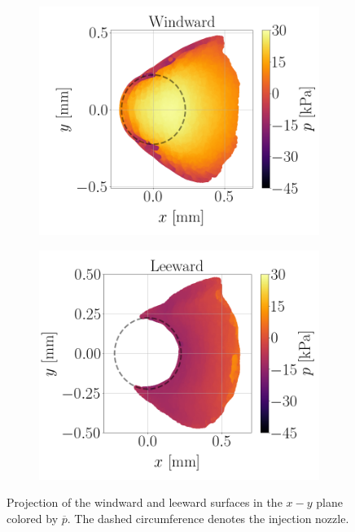 \begin{figure}[ht]
\flushleft
\begin{subfigure}[b]{0.45\textwidth}
	\flushleft
   \includegraphics[scale=0.25]{./part2_developments/figures_ch5_resolved_JICF/pressure_obtention_mean_DC/p_mean_scatter_UG100_DX10_windward}
\end{subfigure}
\hspace{0.5in}
\begin{subfigure}[b]{0.45\textwidth}
	\flushleft
   \includegraphics[scale=0.25]{./part2_developments/figures_ch5_resolved_JICF/pressure_obtention_mean_DC/p_mean_scatter_UG100_DX10_leeward}
\end{subfigure}
\caption[Projection of the windward and leeward surfaces in the $x-y$ plane colored by $\overline{p}$.]{Projection of the windward and leeward surfaces in the $x-y$ plane colored by $\overline{p}$. The dashed circumference denotes the injection nozzle.}
\label{fig:jicf_DC_p_mean_scatterplots}
\end{figure}


